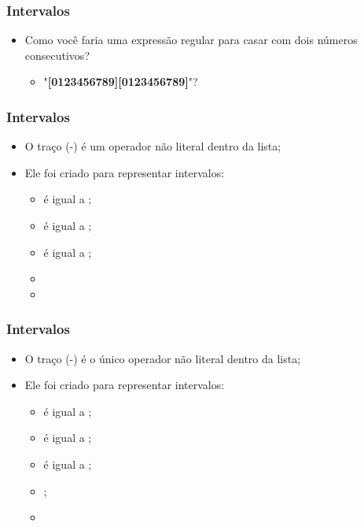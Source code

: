\begin{frame}
	\frametitle{Intervalos}
	
	\begin{itemize}
		\item Como você faria uma expressão regular para casar com dois números consecutivos?
		\begin{itemize}
			\item "\textbf{[0123456789][0123456789]}"?
		\end{itemize}
	\end{itemize}
\end{frame}

\begin{frame}
	\frametitle{Intervalos}

	\begin{itemize}
		\item O traço (-) é um operador não literal dentro da lista;
		\item Ele foi criado para representar intervalos:
			\begin{itemize}
				\item {} é igual a ;
				\item {} é igual a ;
				\item {} é igual a ;
				\item {}
				\item \lista{ -\textasciitilde}
			\end{itemize}
	\end{itemize}
\end{frame}

\begin{frame}
	\frametitle{Intervalos}

	\begin{itemize}
		\item O traço (-) é o único operador não literal dentro da lista;
		\item Ele foi criado para representar intervalos:
			\begin{itemize}
				\item {} é igual a ;
				\item {} é igual a ;
				\item {} é igual a ;
				\item {};
				\item \lista{ -\textasciitilde}\Huge{\bf {}}
			\end{itemize}
	\end{itemize}
\end{frame}

